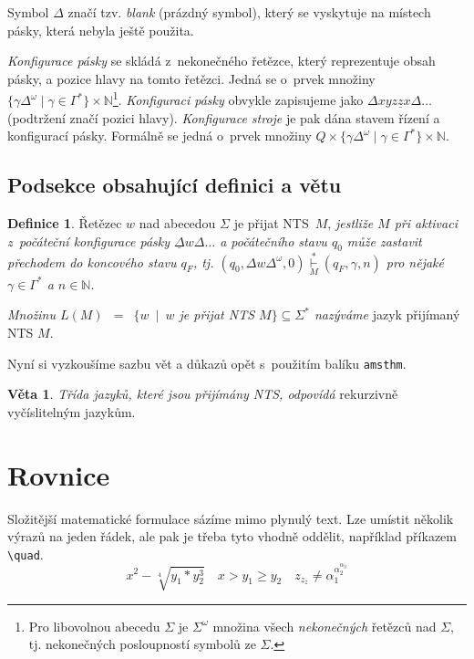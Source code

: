 \documentclass[twocolumn, 11pt, a4paper, titlepage]{article}
\theoremstyle{definition}
\newtheorem{dfn}{Definice}
\newtheorem{vta}{Věta}
\begin{document}
Symbol $\Delta$ značí tzv. \emph{blank} (prázdný symbol), který se vyskytuje na místech pásky, která nebyla ještě použita.

\emph{Konfigurace pásky} se skládá z~nekonečného řetězce, který reprezentuje obsah pásky, a pozice hlavy na tomto řetězci. Jedná se o~prvek množiny $\{\gamma \Delta^\omega \mid \gamma \in \Gamma^*\} \times \mathbb{N}$\footnote{Pro libovolnou abecedu $\Sigma$ je $\Sigma^\omega$ množina všech \emph{nekonečných} řetězců nad $\Sigma$, tj. nekonečných posloupností symbolů ze $\Sigma$.}.
\emph{Konfiguraci pásky} obvykle zapisujeme jako ${\Delta xyz\underline{z}x \Delta \dots}$
(podtržení značí pozici hlavy). 
\emph{Konfigurace stroje} je pak dána stavem řízení a konfigurací pásky. Formálně se jedná o~prvek množiny $Q \times \{\gamma \Delta^\omega \mid \gamma \in \Gamma^*\} \times \mathbb{N}$.

\subsection{Podsekce obsahující definici a větu}
\begin{dfn}\label{dfn:dfn_2}Řetězec $w$ nad abecedou $\Sigma$ je přijat NTS~$M$, \emph{jestliže $M$ při aktivaci z~počáteční konfigurace pásky ${\underline{\Delta}w\Delta \dots}$ %
a počátečního stavu $q_0$ může zastavit přechodem do koncového stavu $q_F$, tj. $(q_0, \Delta w \Delta^\omega, 0) \overset{*}{\underset{M}{\vdash}} (q_F, \gamma, n)$ pro nějaké $\gamma \in \Gamma^*$ a $n \in \mathbb{N}$}.

\emph{Množinu $L(M)$\ $=$\ $\{w\:\mid\:w$ je přijat NTS $M\} \subseteq \Sigma^*$ nazýváme} jazyk přijímaný NTS $M$.\end{dfn}
Nyní si vyzkoušíme sazbu vět a důkazů opět s~použitím balíku \verb|amsthm|.

\begin{vta}\label{vta:vta_1}\emph{Třída jazyků, které jsou přijímány NTS, odpovídá} rekurzivně vyčíslitelným jazykům.\end{vta}

\section{Rovnice}
Složitější matematické formulace sázíme mimo plynulý text. Lze umístit několik výrazů na jeden řádek, ale pak je třeba tyto vhodně oddělit, například příkazem \verb|\quad|.
\[
x^2 - \sqrt[4]{y_1*y_2^3} \quad x > y_1 \geq y_2 \quad z_{z_z} \not = \alpha_1^{\alpha_2^{\alpha_3}}
\]
\end{document}
